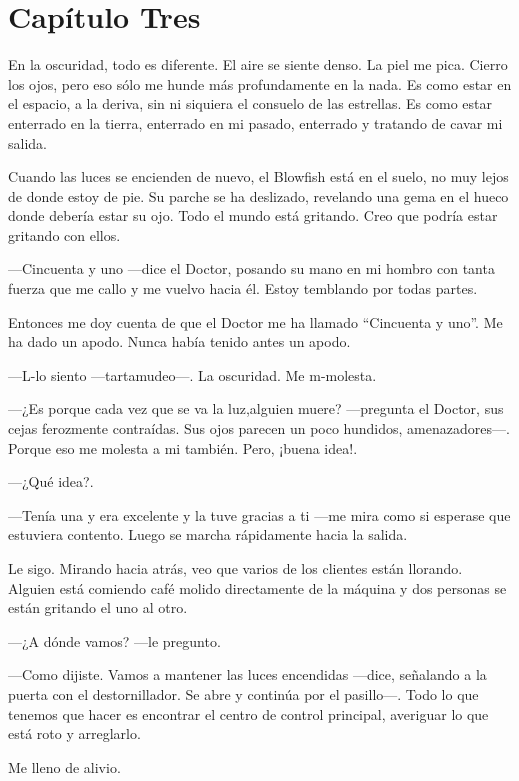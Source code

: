 \chapter*{Capítulo Tres}


En la oscuridad, todo es diferente. El aire se siente denso. La piel me
pica. Cierro los ojos, pero eso sólo me hunde más profundamente en la
nada. Es como estar en el espacio, a la deriva, sin ni siquiera el
consuelo de las estrellas. Es como estar enterrado en la tierra,
enterrado en mi pasado, enterrado y tratando de cavar mi salida.

Cuando las luces se encienden de nuevo, el Blowfish está en el suelo, no
muy lejos de donde estoy de pie. Su parche se ha deslizado, revelando
una gema en el hueco donde debería estar su ojo. Todo el mundo está
gritando. Creo que podría estar gritando con ellos.

---Cincuenta y uno ---dice el Doctor, posando su mano en mi hombro con
tanta fuerza que me callo y me vuelvo hacia él. Estoy temblando por
todas partes.

Entonces me doy cuenta de que el Doctor me ha llamado ``Cincuenta y
uno''. Me ha dado un apodo. Nunca había tenido antes un apodo.

---L-lo siento ---tartamudeo---. La oscuridad. Me m-molesta.

---¿Es porque cada vez que se va la luz,alguien muere? ---pregunta el
Doctor, sus cejas ferozmente contraídas. Sus ojos parecen un poco
hundidos, amenazadores---. Porque eso me molesta a mi también. Pero,
¡buena idea!.

---¿Qué idea?.

---Tenía una y era excelente y la tuve gracias a ti ---me mira como si
esperase que estuviera contento. Luego se marcha rápidamente hacia la
salida.

Le sigo. Mirando hacia atrás, veo que varios de los clientes están
llorando. Alguien está comiendo café molido directamente de la máquina y
dos personas se están gritando el uno al otro.

---¿A dónde vamos? ---le pregunto.

---Como dijiste. Vamos a mantener las luces encendidas ---dice,
señalando a la puerta con el destornillador. Se abre y continúa por el
pasillo---. Todo lo que tenemos que hacer es encontrar el centro de
control principal, averiguar lo que está roto y arreglarlo.

Me lleno de alivio. 

